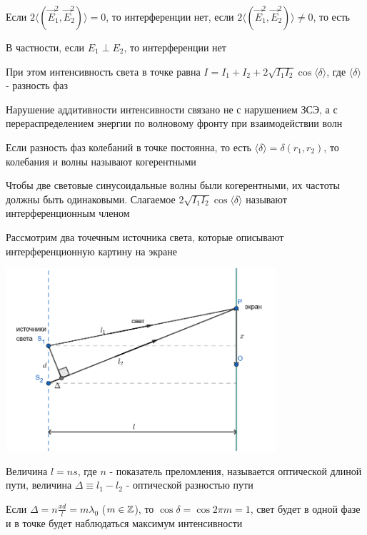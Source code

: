 \documentclass[12pt]{article}
\begin{document}
Если $2\langle (\vec E^2_1, \vec E_2^2) \rangle = 0$, то интерференции нет, если $2\langle (\vec E^2_1, \vec E_2^2) \rangle \neq 0$, то есть 

В частности, если $E_1 \perp E_2$, то интерференции нет 

При этом интенсивность света в точке равна $I = I_1 + I_2 + 2\sqrt{I_1 I_2} \cos \langle \delta \rangle$, где $\langle \delta \rangle$ - разность фаз

Нарушение аддитивности интенсивности связано не с нарушением ЗСЭ, а с перераспределением энергии 
по волновому фронту при взаимодействии волн

Если разность фаз колебаний в точке постоянна, то есть $\langle \delta \rangle = \delta (r_1, r_2)$, то колебания и волны называют когерентными

Чтобы две световые синусоидальные волны были когерентными, их частоты должны быть одинаковыми.
Слагаемое $2\sqrt{I_1 I_2} \cos \langle \delta \rangle$ называют интерференционным членом

\mediumvspace

Рассмотрим два точечным источника света, которые описывают интерференционную картину на экране

\smallvspace


\begin{center}
    \includegraphics[width=0.75\textwidth]{physics2/images/physics2_2025_04_07_1}
\end{center}

\smallvspace

Величина $l = ns$, где $n$ - показатель преломления, называется оптической длиной пути, 
величина $\Delta \equiv l_1 - l_2$ - оптической разностью пути

Если $\Delta = n \frac{x d}{l} = m \lambda_0$ ($m \in \mathbb{Z}$), то $\cos \delta = \cos 2\pi m = 1$, свет будет в одной фазе 
и в точке будет наблюдаться максимум интенсивности
\end{document}
